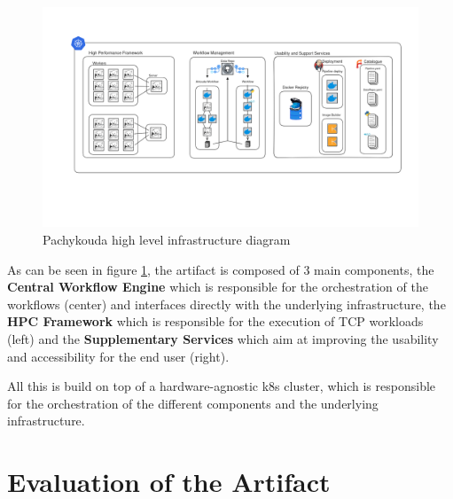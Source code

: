 \begin{figure}[htb]
    \centering
    \includegraphics[width=16cm]{graphics/pachykouda_three_aspects.png}
    \caption[Pachykouda high level diagram showing three main aspects]{Pachykouda high level infrastructure diagram}
    \label{abb:pachykouda_three_aspects}
\end{figure}


As can be seen in figure \ref{abb:pachykouda_three_aspects}, the artifact is composed of 3 main components, 
the \textbf{Central Workflow Engine} which is responsible for the orchestration of the workflows (center) and interfaces directly with the underlying infrastructure,
the \textbf{\ac{HPC} Framework} which is responsible for the execution of \ac{TCP} workloads (left)
and the \textbf{Supplementary Services} which aim at improving the usability and accessibility for the end user (right).

All this is build on top of a hardware-agnostic \ac{k8s} cluster, which is responsible for the orchestration of the different components and the underlying infrastructure.

\newpage






\newpage
\section{Evaluation of the Artifact}


